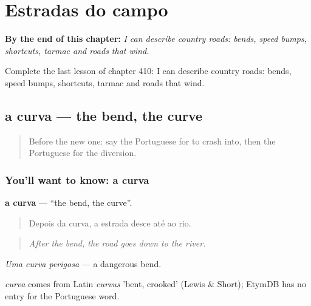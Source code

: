 
\chapter{Estradas do campo}
\label{ch:pt-estradas-do-campo}

\begin{chapteropening}
\textbf{By the end of this chapter:} \emph{I can describe country roads: bends, speed bumps, shortcuts, tarmac and roads that wind.}

Complete the last lesson of chapter 410: I can describe country roads: bends, speed bumps, shortcuts, tarmac and roads that wind.
\end{chapteropening}

\section[a curva]{a curva — the bend, the curve}

\label{lesson:PT-C410-curva}



\begin{quote}
Before the new one: say the Portuguese for to crash into, then the Portuguese for the diversion.
\end{quote}

\subsection*{You'll want to know: a curva}
\textbf{a curva} — \textquotedblleft{}the bend, the curve\textquotedblright{}.

\begin{quote}
Depois da curva, a estrada desce até ao rio.
\end{quote}

\begin{quote}
\emph{After the bend, the road goes down to the river.}
\end{quote}

\emph{Uma curva perigosa} — a dangerous bend.

\begin{cousinweb}
\emph{curva} comes from Latin \emph{curvus} 'bent, crooked' (Lewis \& Short); EtymDB has no entry for the Portuguese word.
\end{cousinweb}

